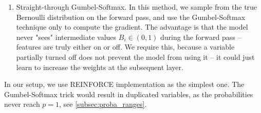 \documentclass[a4paper,11pt,oneside]{report}
\begin{document}
\begin{enumerate}


    \item Straight-through Gumbel-Softmax. In this method, we sample from the true Bernoulli distribution on the forward pass, and use the Gumbel-Softmax technique only to compute the gradient. The advantage is that the model never "sees" intermediate values $B_i\in(0,1)$ during the forward pass -- features are truly either on or off. We require this, because a variable partially turned off does not prevent the model from using it -- it could just learn to increase the weights at the subsequent layer.
\end{enumerate}

In our setup, we use REINFORCE implementation as the simplest one.%
The Gumbel-Softmax trick would result in duplicated variables, as the probabilities never reach $p=1$, see \autoref{subsec:proba_ranges}.


\end{document}

